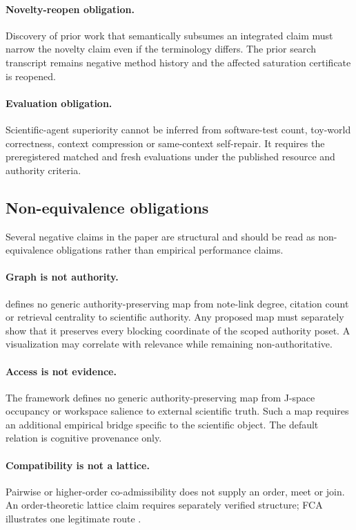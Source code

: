 \paragraph{Novelty-reopen obligation.}
Discovery of prior work that semantically subsumes an integrated \RAKL{} claim must narrow the novelty claim even if the terminology differs. The prior search transcript remains negative method history and the affected saturation certificate is reopened.

\paragraph{Evaluation obligation.}
Scientific-agent superiority cannot be inferred from software-test count, toy-world correctness, context compression or same-context self-repair. It requires the preregistered matched and fresh evaluations under the published resource and authority criteria.

\subsection{Non-equivalence obligations}

Several negative claims in the paper are structural and should be read as non-equivalence obligations rather than empirical performance claims.

\paragraph{Graph is not authority.}
\RAKL{} defines no generic authority-preserving map from note-link degree, citation count or retrieval centrality to scientific authority. Any proposed map must separately show that it preserves every blocking coordinate of the scoped authority poset. A visualization may correlate with relevance while remaining non-authoritative.

\paragraph{Access is not evidence.}
The framework defines no generic authority-preserving map from J-space occupancy or workspace salience to external scientific truth. Such a map requires an additional empirical bridge specific to the scientific object. The default relation is cognitive provenance only.

\paragraph{Compatibility is not a lattice.}
Pairwise or higher-order co-admissibility does not supply an order, meet or join. An order-theoretic lattice claim requires separately verified structure; FCA illustrates one legitimate route \cite{ganterwille2024}.

